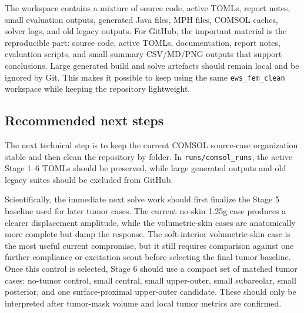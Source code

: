 The workspace contains a mixture of source code, active TOMLs, report notes, small evaluation outputs, generated Java files, MPH files, COMSOL caches, solver logs, and old legacy outputs. For GitHub, the important material is the reproducible part: source code, active TOMLs, documentation, report notes, evaluation scripts, and small summary CSV/MD/PNG outputs that support conclusions. Large generated build and solve artefacts should remain local and be ignored by Git. This makes it possible to keep using the same \texttt{ews\_fem\_clean} workspace while keeping the repository lightweight.

\subsection{Recommended next steps}

The next technical step is to keep the current COMSOL source-case organization stable and then clean the repository by folder. In \texttt{runs/comsol\_runs}, the active Stage 1--6 TOMLs should be preserved, while large generated outputs and old legacy suites should be excluded from GitHub.

Scientifically, the immediate next solve work should first finalize the Stage 5 baseline used for later tumor cases. The current no-skin 1.25g case produces a clearer displacement amplitude, while the volumetric-skin cases are anatomically more complete but damp the response. The soft-interior volumetric-skin case is the most useful current compromise, but it still requires comparison against one further compliance or excitation scout before selecting the final tumor baseline. Once this control is selected, Stage 6 should use a compact set of matched tumor cases: no-tumor control, small central, small upper-outer, small subareolar, small posterior, and one surface-proximal upper-outer candidate. These should only be interpreted after tumor-mask volume and local tumor metrics are confirmed.
